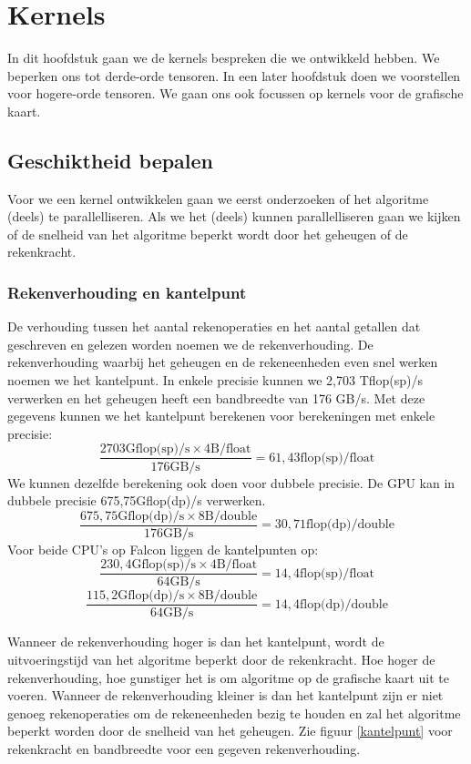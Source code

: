 \chapter{Kernels}
\label{h:kernels} 
In dit hoofdstuk gaan we de kernels bespreken die we ontwikkeld hebben. We beperken ons tot derde-orde tensoren. In een later hoofdstuk doen we voorstellen voor hogere-orde tensoren. We gaan ons ook focussen op kernels voor de grafische kaart.

\section{Geschiktheid bepalen}
Voor we een kernel ontwikkelen gaan we eerst onderzoeken of het algoritme (deels) te parallelliseren. Als we het (deels) kunnen parallelliseren gaan we kijken of de snelheid van het algoritme beperkt wordt door het geheugen of de rekenkracht.

\subsection{Rekenverhouding en kantelpunt}
De verhouding tussen het aantal rekenoperaties en het aantal getallen dat geschreven en gelezen worden noemen we de rekenverhouding. De rekenverhouding waarbij het geheugen en de rekeneenheden even snel werken noemen we het kantelpunt. In enkele precisie kunnen we 2,703 Tflop(sp)/s verwerken en het geheugen heeft een bandbreedte van 176 GB/s. Met deze gegevens kunnen we het kantelpunt berekenen voor berekeningen met enkele precisie:
\[
	\frac{2703 \text{Gflop(sp)/s} \times 4 \text{B/float}}
         {176 \text{GB/s}}										= 61,43 \text{flop(sp)/float}
\]
We kunnen dezelfde berekening ook doen voor dubbele precisie. De GPU kan in dubbele precisie 675,75Gflop(dp)/s verwerken.
\[
	\frac{675,75 \text{Gflop(dp)/s} \times 8 \text{B/double}}
         {176 \text{GB/s}}										= 30,71 \text{flop(dp)/double}
\]
Voor beide CPU's op Falcon liggen de kantelpunten op:
\[
	\frac{230,4 \text{Gflop(sp)/s} \times 4 \text{B/float}}
         {64 \text{GB/s}}										= 14,4 \text{flop(sp)/float}
\]
\[
	\frac{115,2 \text{Gflop(dp)/s} \times 8 \text{B/double}}
         {64 \text{GB/s}}										= 14,4 \text{flop(dp)/double}                                    
\]

Wanneer de rekenverhouding hoger is dan het kantelpunt, wordt de uitvoeringstijd van het algoritme beperkt door de rekenkracht. Hoe hoger de rekenverhouding, hoe gunstiger het is om algoritme op de grafische kaart uit te voeren. Wanneer de rekenverhouding kleiner is dan het kantelpunt zijn er niet genoeg rekenoperaties om de rekeneenheden bezig te houden en zal het algoritme beperkt worden door de snelheid van het geheugen. Zie figuur \ref{kantelpunt} voor rekenkracht en bandbreedte voor een gegeven rekenverhouding.

